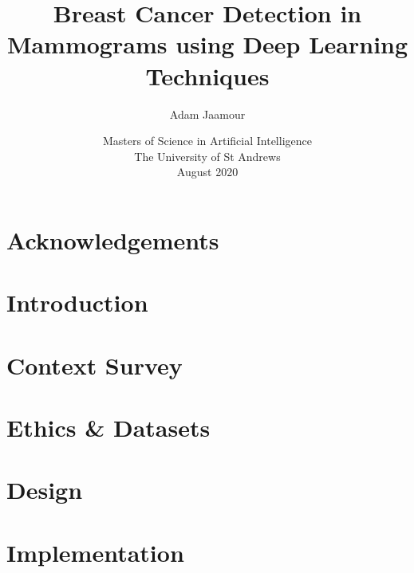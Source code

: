 \documentclass[11pt,openright,twoside,a4paper]{report}
\title{Breast Cancer Detection in Mammograms using Deep Learning Techniques}
\author{Adam Jaamour}
\date{Masters of Science in Artificial Intelligence\\The University of St Andrews\\August 2020}
\begin{document}
\setcounter{page}{0}

\maketitle
\newpage

\newpage

\abstract

\newpage

\setcounter{tocdepth}{4}
\tableofcontents
\newpage
\listoffigures
\newpage
\listoftables
\newpage

\chapter*{Acknowledgements}

\newpage


\setcounter{page}{1}

\chapter{Introduction}
\label{ch:chapter-intro}


\chapter{Context Survey}
\label{ch:chapter-litsurvey}


\chapter{Ethics \& Datasets}
\label{ch:chapter-ethics-datasets}


\chapter{Design}
\label{ch:chapter-design}


\chapter{Implementation}
\label{ch:chapter-implementation}

\end{document}
